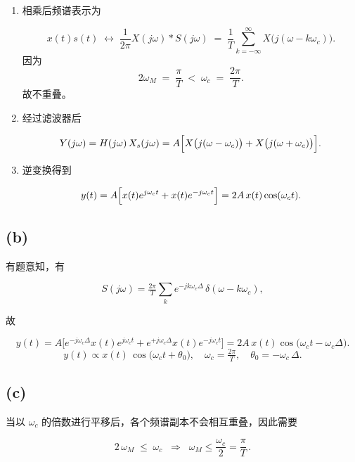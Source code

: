 \documentclass[11pt]{article}
\begin{document}
\begin{enumerate}
\def\labelenumi{\arabic{enumi}.}
\item
  相乘后频谱表示为

  \[
  x(t)s(t)\;\longleftrightarrow\;
     \frac{1}{2\pi}X(j\omega)\ast S(j\omega)
     \;=\;\frac{1}{T}\sum_{k=-\infty}^{\infty}X\bigl(j(\omega-k\omega_c)\bigr).
  \] 因为 \[
  2\omega_M \;=\;\frac{\pi}{T}\;<\;\omega_c\;=\;\frac{2\pi}{T}.
  \] 故不重叠。
\item
  经过滤波器后

  \[
  Y(j\omega)
     = H(j\omega)\,X_s(j\omega)
     = A\Bigl[X\bigl(j(\omega-\omega_c)\bigr)+X\bigl(j(\omega+\omega_c)\bigr)\Bigr].
  \]
\item
  逆变换得到

  \[
  y(t)
        = A\Bigl[x(t)e^{j\omega_c t}+x(t)e^{-j\omega_c t}\Bigr]
        = 2A\,x(t)\cos(\omega_c t).
  \]
\end{enumerate}

\subsection{(b)}\label{b}

有题意知，有

\[
S(j\omega)=\tfrac{2\pi}{T}\sum_k e^{-jk\omega_c\Delta}\,\delta(\omega-k\omega_c),
\]

故

\[
y(t)
= A\bigl[e^{-j\omega_c\Delta}x(t)e^{j\omega_c t}+e^{+j\omega_c\Delta}x(t)e^{-j\omega_c t}\bigr]
= 2A\,x(t)\cos\!\bigl(\omega_c t-\omega_c\Delta\bigr).
\] \[
\boxed{y(t)\propto x(t)\,\cos\!\bigl(\omega_c t+\theta_0\bigr),
\quad
\omega_c=\tfrac{2\pi}{T},\quad
\theta_0=-\omega_c\,\Delta.}
\]

\subsection{(c)}\label{c}

当以 \(\omega_c\) 的倍数进行平移后，各个频谱副本不会相互重叠，因此需要

\[
2\,\omega_M\;\le\;\omega_c
\;\;\Longrightarrow\;\;
\boxed{\omega_M\le\frac{\omega_c}{2}=\frac{\pi}{T}\,.}
\]


    
    
    
\end{document}
